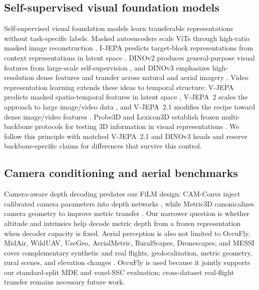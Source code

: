 \subsection{Self-supervised visual foundation models}
Self-supervised visual foundation models learn transferable representations without task-specific labels. Masked autoencoders scale ViTs through high-ratio masked image reconstruction \cite{he2022mae}. I-JEPA predicts target-block representations from context representations in latent space \cite{assran2023ijepa}. DINOv2 produces general-purpose visual features from large-scale self-supervision \cite{oquab2024dinov2}, and DINOv3 emphasizes high-resolution dense features and transfer across natural and aerial imagery \cite{simeoni2025dinov3}. Video representation learning extends these ideas to temporal structure: V-JEPA predicts masked spatio-temporal features in latent space \cite{bardes2024vjepa}, V-JEPA~2 scales the approach to large image/video data \cite{assran2025vjepa2}, and V-JEPA~2.1 modifies the recipe toward dense image/video features \cite{murlabadia2026vjepa21}. Probe3D and Lexicon3D establish frozen multi-backbone protocols for testing 3D information in visual representations \cite{elbanani2024probe3d,lexicon3d2024}. We follow this principle with matched V-JEPA~2.1 and DINOv3 heads and reserve backbone-specific claims for differences that survive this control.

\subsection{Camera conditioning and aerial benchmarks}
Camera-aware depth decoding predates our FiLM design: CAM-Convs inject calibrated camera parameters into depth networks \cite{facil2019camconvs}, while Metric3D canonicalizes camera geometry to improve metric transfer \cite{hu2024metric3dv2}. Our narrower question is whether altitude and intrinsics help decode metric depth from a frozen representation when decoder capacity is fixed. Aerial perception is also not limited to OccuFly. MidAir, WildUAV, UseGeo, AerialMetric, RuralScapes, Dronescapes, and MESSI cover complementary synthetic and real flights, geolocalization, metric geometry, rural scenes, and elevation changes \cite{fonder2019midair,wilduav2022,usegeo2023,aerialmetric2024,dronescapes2024,messi2024}. OccuFly is used because it jointly supports our standard-split MDE and voxel-SSC evaluation; cross-dataset real-flight transfer remains necessary future work.

